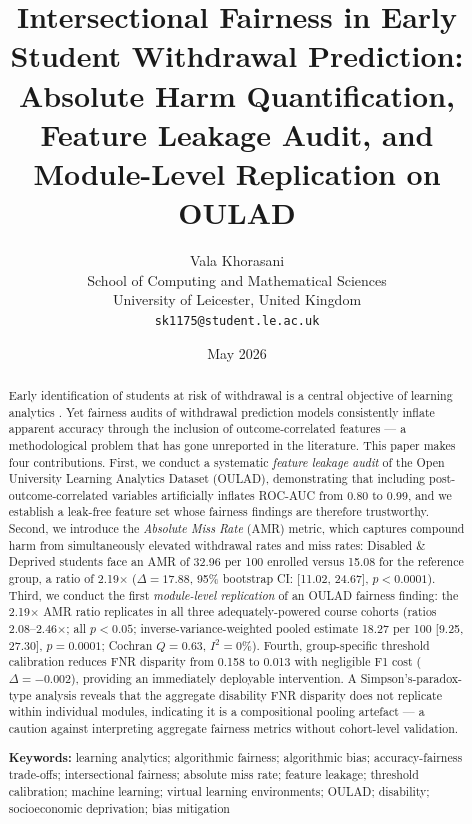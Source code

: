 \documentclass[12pt,a4paper]{article}
\title{%
  \vspace{-1.5cm}
  \Large\textbf{Intersectional Fairness in Early Student Withdrawal Prediction:
  Absolute Harm Quantification, Feature Leakage Audit, and Module-Level
  Replication on OULAD}
}
\author{%
  Vala Khorasani\\[4pt]
  \normalsize School of Computing and Mathematical Sciences\\
  \normalsize University of Leicester, United Kingdom\\[4pt]
  \normalsize \texttt{sk1175@student.le.ac.uk}
}
\date{May 2026}
\begin{document}
\maketitle
\thispagestyle{empty}

\begin{abstract}
\noindent
Early identification of students at risk of withdrawal is a central objective
of learning analytics \citep{siemens2013, ferguson2012}. Yet fairness audits of
withdrawal prediction models consistently inflate apparent accuracy through the
inclusion of outcome-correlated features --- a methodological problem that has
gone unreported in the literature. This paper makes four contributions. First,
we conduct a systematic \textit{feature leakage audit} of the Open University
Learning Analytics Dataset (OULAD), demonstrating that including
post-outcome-correlated variables artificially inflates ROC-AUC from 0.80 to
0.99, and we establish a leak-free feature set whose fairness findings are
therefore trustworthy. Second, we introduce the \textit{Absolute Miss Rate}
(AMR) metric, which captures compound harm from simultaneously elevated
withdrawal rates and miss rates: Disabled \& Deprived students face an AMR of
32.96 per 100 enrolled versus 15.08 for the reference group, a ratio of
2.19$\times$ ($\Delta = 17.88$, 95\% bootstrap CI: [11.02, 24.67],
$p < 0.0001$). Third, we conduct the first \textit{module-level replication}
of an OULAD fairness finding: the 2.19$\times$ AMR ratio replicates in all
three adequately-powered course cohorts (ratios 2.08--2.46$\times$; all
$p < 0.05$; inverse-variance-weighted pooled estimate 18.27 per 100 [9.25,
27.30], $p = 0.0001$; Cochran $Q = 0.63$, $I^2 = 0\%$). Fourth,
group-specific threshold calibration reduces FNR disparity from 0.158 to 0.013
with negligible F1 cost ($\Delta = {-}0.002$), providing an immediately
deployable intervention. A Simpson's-paradox-type analysis reveals that the
aggregate disability FNR disparity does not replicate within individual modules,
indicating it is a compositional pooling artefact --- a caution against
interpreting aggregate fairness metrics without cohort-level validation.

\bigskip
\noindent\textbf{Keywords:} learning analytics; algorithmic fairness;
algorithmic bias; accuracy-fairness trade-offs; intersectional fairness;
absolute miss rate; feature leakage; threshold calibration; machine learning;
virtual learning environments; OULAD; disability; socioeconomic deprivation;
bias mitigation
\end{abstract}
\end{document}
